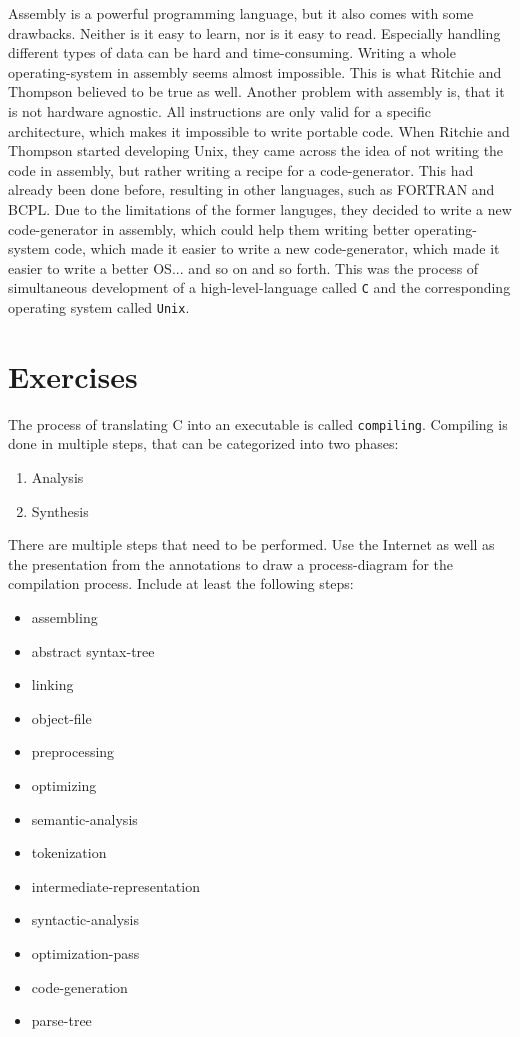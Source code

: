 \documentclass{dcbl/challenge}
\begin{document}
Assembly is a powerful programming language, but it also comes with some drawbacks. 
Neither is it easy to learn, nor is it easy to read. 
Especially handling different types of data can be hard and time-consuming.
Writing a whole operating-system in assembly seems almost impossible. 
This is what Ritchie and Thompson believed to be true as well. 
Another problem with assembly is, that it is not hardware agnostic. 
All instructions are only valid for a specific architecture, which makes it impossible to write portable code.
When Ritchie and Thompson started developing Unix, they came across the idea of not writing the code in assembly, but rather writing a recipe for a code-generator. 
This had already been done before, resulting in other languages, such as FORTRAN and BCPL.
Due to the limitations of the former languges, they decided to write a new code-generator in assembly, which could help them writing better operating-system code, which made it easier to write a new code-generator, which made it easier to write a better OS... and so on and so forth. 
This was the process of simultaneous development of a high-level-language called \texttt{C} and the corresponding operating system called \texttt{Unix}.

\section*{Exercises}
\begin{aufgabe}
    The process of translating C into an executable is called \texttt{compiling}.
    Compiling is done in multiple steps, that can be categorized into two phases: 
    \begin{enumerate}
        \item Analysis
        \item Synthesis
    \end{enumerate} 
    There are multiple steps that need to be performed. 
    Use the Internet as well as the presentation from the annotations to draw a process-diagram for the compilation process.
    Include at least the following steps:
    \begin{itemize}
        \item assembling
        \item abstract syntax-tree
        \item linking
        \item object-file
        \item preprocessing
        \item optimizing
        \item semantic-analysis 
        \item tokenization
        \item intermediate-representation
        \item syntactic-analysis 
        \item optimization-pass
        \item code-generation
        \item parse-tree
    \end{itemize}
\end{aufgabe}
\end{document}
